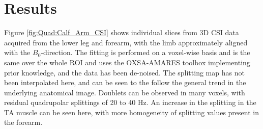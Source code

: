 
\section{Results}

Figure \ref{fig:Quad:Calf_Arm_CSI} shows individual slices from 3D \ac{CSI} data acquired from the lower leg and forearm, with the limb approximately aligned with the $B_0$-direction. The fitting is performed on a voxel-wise basis and is the same over the whole \ac{ROI} and uses the OXSA-AMARES toolbox \cite{Purvis2017OXSA:MATLAB} implementing prior knowledge, and the data has been de-noised. The splitting map has not been interpolated here, and can be seen to the follow the general trend in the underlying anatomical image. Doublets can be observed in many voxels, with residual quadrupolar splittings of 20 to 40 Hz. An increase in the splitting in the \ac{TA} muscle can be seen here, with more homogeneity of splitting values present in the forearm.


